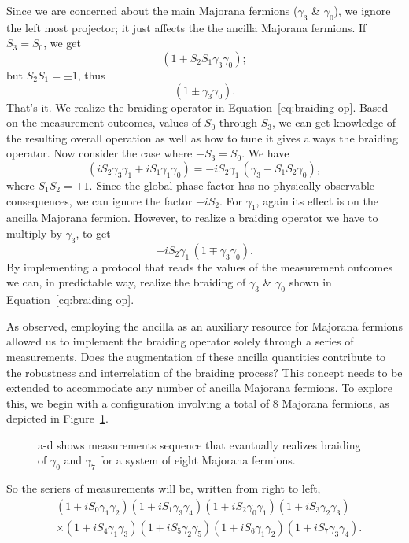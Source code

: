 \documentclass{article}
\begin{document}
Since we are concerned about the main Majorana fermions ($ \gamma_3 $ \& $ \gamma_0 $), we ignore the left most projector; it just affects the the ancilla Majorana fermions.
If $ S_3 = S_0 $, we get
\[
	( 1 + S_2 S_1 \gamma_3 \gamma_0 );
\]
but $ S_2 S_1 = \pm 1 $, thus
\[
	( 1 \pm \gamma_3 \gamma_0 ).
\]
That's it. We realize the braiding operator in Equation~\ref{eq:braiding op}. Based on the measurement outcomes, values of $ S_0 $ through $ S_3 $, we can get knowledge of the resulting overall operation as well as how to tune it gives always the braiding operator. Now consider the case where $ -S_3 = S_0 $. We have
\[
	( iS_2 \gamma_3 \gamma_1 +iS_1 \gamma_1 \gamma_0)
	= -i S_2 \gamma_1\, ( \gamma_3 - S_1 S_2 \gamma_0) ,
\]
where $ S_1 S_2 = \pm 1 $. Since the global phase factor has no physically observable consequences, we can ignore the factor $ -iS_2 $. For $ \gamma_1 $, again its effect is on the ancilla Majorana fermion. However, to realize a braiding operator we have to multiply by $ \gamma_3 $, to get
\[
	-iS_2 \gamma_1\, (1 \mp \gamma_3 \gamma_0).
\]
By implementing a protocol that reads the values of the measurement outcomes we can, in predictable way, realize the braiding of $ \gamma_3 $ \& $ \gamma_0 $ shown in Equation~\ref{eq:braiding op}.

\vspace{12pt}
As observed, employing the ancilla as an auxiliary resource for Majorana fermions allowed us to implement the braiding operator solely through a series of measurements. Does the augmentation of these ancilla quantities contribute to the robustness and interrelation of the braiding process? This concept needs to be extended to accommodate any number of ancilla Majorana fermions. To explore this, we begin with a configuration involving a total of 8 Majorana fermions, as depicted in Figure~\ref{fig:8-conf-meas}.
\begin{figure}
	\begin{center}
		
	\end{center}
	\caption{a-d shows measurements sequence that evantually realizes braiding of $ \gamma_0 $ and $ \gamma_7 $ for a system of eight Majorana fermions.}
	\label{fig:8-conf-meas}
\end{figure}
So the seriers of measurements will be, written from right to left,
\[
	\begin{aligned}
		 & (1+ i S_0 \gamma_1 \gamma_2)(1+ i S_1 \gamma_3 \gamma_4)(1+ i S_2 \gamma_0 \gamma_1) (1+ i S_3 \gamma_2 \gamma_3)         \\
		 & \times (1+ i S_4 \gamma_1 \gamma_3)(1+ i S_5 \gamma_2 \gamma_5)(1+ i S_6 \gamma_1 \gamma_2)(1+ i S_7 \gamma_3 \gamma_4) .
	\end{aligned}
\]
\end{document}
